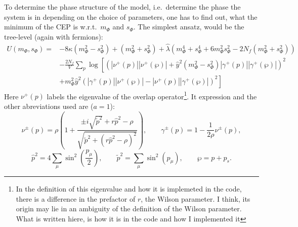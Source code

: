To determine the phase structure of the model, i.e.\ determine the phase the system is in depending on the choice of parameters, 
one has to find out, what the minimum of the CEP is w.r.t.\ $m_{\Phi}$ and $s_{\Phi}$. The simplest ansatz, would be the tree-level (again with fermions):
\begin{align}\label{eq:CEP_treelevel}
 U(m_{\Phi}, s_{\Phi}) =& -8 \kappa \left( m_{\Phi}^2 - s_{\Phi}^2 \right)   +   \left( m_{\Phi}^2 + s_{\Phi}^2 \right)
                         + \hat\lambda \left( m_{\Phi}^4 + s_{\Phi}^4 + 6 m_{\Phi}^2 s_{\Phi}^2 - 2 N_f \left(m_{\Phi}^2 + s_{\Phi}^2 \right) \right) 
                           \nonumber \\
                        & -\frac{2N_f}{V} \sum\limits_p \log
                                    \left[ \left( |\nu^+(p)| |\nu^+(\wp)|   +
                                    \hat y ^2 \left( m_{\Phi}^2 - s_{\Phi}^2 \right) |\gamma^+(p)| |\gamma^+(\wp)|\right)^2 
                                    \nonumber \right. \\ 
                        & \left. +  m_{\Phi}^2 \hat y^2 \left( |\gamma^+(p)| |\nu^+(\wp)|   -   |\nu^+(p)| |\gamma^+(\wp)| \right)^2\right]
\end{align}
Here $\nu^+(p)$ labels the eigenvalue of the overlap operator\footnote{In the definition of this eigenvalue and how it is implemeted in the 
code, there is a difference in the prefactor of $r$, the Wilson parameter. I think, its origin may lie in an ambiguity of
the definition of the Wilson parameter. What is written hiere, is how it is in the code and how I implemented it}. 
It expression and the other abreviations used are ($a=1$):
\begin{equation}
 \label{eq:eigenvalue_overlapOperator_and_gamma}
 \nu^{\pm}(p) = \rho \left( 1 + 
                      \frac{ \pm i \sqrt{{\tilde p} ^2} + r  {\hat p}^2 - \rho}
                           {\sqrt{ {\tilde p} ^2 + \left( r  {\hat p}^2 - \rho\right)^2}}\right),\qquad
 \gamma^{\pm}(p) = 1- \frac{1}{2 \rho}\nu^{\pm}(p),
 \end{equation}
 \begin{equation}
 \label{eq:def_momentumAbreviations}
 {\hat p}^2 = 4 \sum\limits_{\mu} \sin^2\left(\frac{p_{\mu}}{2}\right),\qquad
 {\tilde p}^2 = \sum\limits_{\mu} \sin^2\left(p_{\mu}\right),\qquad
 \wp = p + p_s.
\end{equation}

